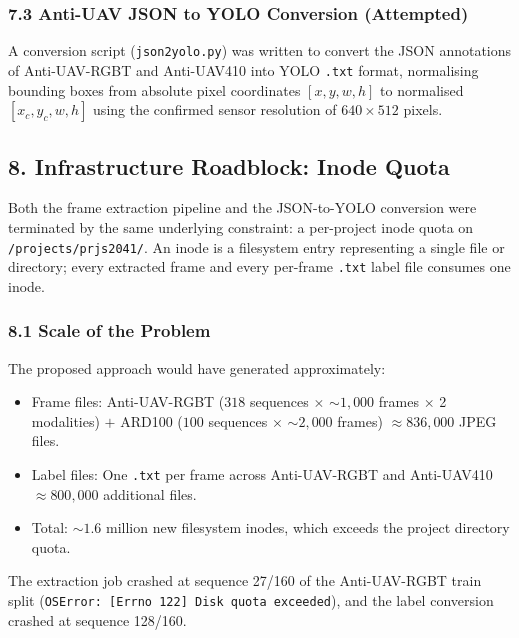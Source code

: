 \subsubsection*{7.3 Anti-UAV JSON to YOLO Conversion (Attempted)}

A conversion script (\texttt{json2yolo.py}) was written to convert the
JSON annotations of Anti-UAV-RGBT and Anti-UAV410 into YOLO
\texttt{.txt} format, normalising bounding boxes from absolute pixel
coordinates $[x, y, w, h]$ to normalised $[x_c, y_c, w, h]$ using the
confirmed sensor resolution of $640 \times 512$ pixels.

\subsection*{8. Infrastructure Roadblock: Inode Quota}

Both the frame extraction pipeline and the JSON-to-YOLO conversion
were terminated by the same underlying constraint: a per-project inode
quota on \texttt{/projects/prjs2041/}. An inode is a filesystem entry
representing a single file or directory; every extracted frame and
every per-frame \texttt{.txt} label file consumes one inode.

\subsubsection*{8.1 Scale of the Problem}

The proposed approach would have generated approximately:

\begin{itemize}
    \item Frame files: Anti-UAV-RGBT ($318$ sequences $\times$
          ${\sim}1{,}000$ frames $\times$ 2 modalities) $+$ ARD100
          ($100$ sequences $\times$ ${\sim}2{,}000$ frames)
          $\approx 836{,}000$ JPEG files.
    \item Label files: One \texttt{.txt} per frame across
          Anti-UAV-RGBT and Anti-UAV410
          $\approx 800{,}000$ additional files.
    \item Total: ${\sim}1.6$ million new filesystem inodes,
          which exceeds the project directory quota.
\end{itemize}

The extraction job crashed at sequence 27/160 of the Anti-UAV-RGBT
train split (\texttt{OSError: [Errno 122] Disk quota exceeded}), and
the label conversion crashed at sequence 128/160.

